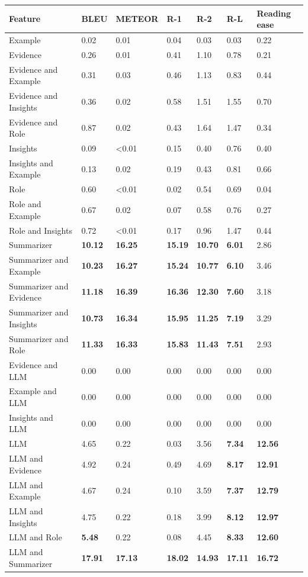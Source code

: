 \begin{tabular}{|l|l|l|l|l|l|l|}
\hline
\textbf{Feature} & BLEU & METEOR & R-1 & R-2 & R-L & Reading ease \\
 \hline
 Example & 0.02 & 0.01 & 0.04 & 0.03 & 0.03 & 0.22 \\
 \hline
 Evidence & 0.26 & 0.01 & 0.41 & 1.10 & 0.78 & 0.21 \\
 \hline
 Evidence and Example & 0.31 & 0.03 & 0.46 & 1.13 & 0.83 & 0.44 \\
 \hline
 Evidence and Insights & 0.36 & 0.02 & 0.58 & 1.51 & 1.55 & 0.70 \\
 \hline
 Evidence and Role & 0.87 & 0.02 & 0.43 & 1.64 & 1.47 & 0.34 \\
 \hline
 Insights & 0.09 & \textless{}0.01 & 0.15 & 0.40 & 0.76 & 0.40 \\
 \hline
 Insights and Example & 0.13 & 0.02 & 0.19 & 0.43 & 0.81 & 0.66 \\
 \hline
 Role & 0.60 & \textless{}0.01 & 0.02 & 0.54 & 0.69 & 0.04 \\
 \hline
 Role and Example & 0.67 & 0.02 & 0.07 & 0.58 & 0.76 & 0.27 \\
 \hline
 Role and Insights & 0.72 & \textless{}0.01 & 0.17 & 0.96 & 1.47 & 0.44 \\
 \hline
 Summarizer & \textbf{10.12} & \textbf{16.25} & \textbf{15.19} & \textbf{10.70} & \textbf{6.01} & 2.86 \\
 \hline
 Summarizer and Example & \textbf{10.23} & \textbf{16.27} & \textbf{15.24} & \textbf{10.77} & \textbf{6.10} & 3.46 \\
 \hline
 Summarizer and Evidence & \textbf{11.18} & \textbf{16.39} & \textbf{16.36} & \textbf{12.30} & \textbf{7.60} & 3.18 \\
 \hline
 Summarizer and Insights & \textbf{10.73} & \textbf{16.34} & \textbf{15.95} & \textbf{11.25} & \textbf{7.19} & 3.29 \\
 \hline
 Summarizer and Role & \textbf{11.33} & \textbf{16.33} & \textbf{15.83} & \textbf{11.43} & \textbf{7.51} & 2.93 \\
 \hline
 Evidence and LLM & 0.00 & 0.00 & 0.00 & 0.00 & 0.00 & 0.00 \\
 \hline
 Example and LLM & 0.00 & 0.00 & 0.00 & 0.00 & 0.00 & 0.00 \\
 \hline
 Insights and LLM & 0.00 & 0.00 & 0.00 & 0.00 & 0.00 & 0.00 \\
 \hline
 LLM & 4.65 & 0.22 & 0.03 & 3.56 & \textbf{7.34} & \textbf{12.56} \\
 \hline
 LLM and Evidence & 4.92 & 0.24 & 0.49 & 4.69 & \textbf{8.17} & \textbf{12.91} \\
 \hline
 LLM and Example & 4.67 & 0.24 & 0.10 & 3.59 & \textbf{7.37} & \textbf{12.79} \\
 \hline
 LLM and Insights & 4.75 & 0.22 & 0.18 & 3.99 & \textbf{8.12} & \textbf{12.97} \\
 \hline
 LLM and Role & \textbf{5.48} & 0.22 & 0.08 & 4.45 & \textbf{8.33} & \textbf{12.60} \\
 \hline
 LLM and Summarizer & \textbf{17.91} & \textbf{17.13} & \textbf{18.02} & \textbf{14.93} & \textbf{17.11} & \textbf{16.72} \\
\hline
\end{tabular}
